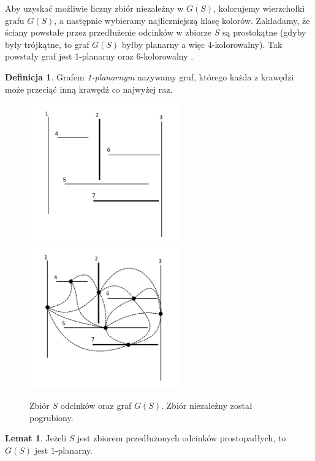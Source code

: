 \documentclass[brudnopis]{xmgr}
\theoremstyle{definition}
\newtheorem{Lemat}{Lemat}
\newtheorem{Definicja}{Definicja}
\begin{document}
\indent Aby uzyskać możliwie liczny zbiór niezależny w $G(S)$, kolorujemy wierzchołki grafu $G(S)$, a następnie wybieramy najliczniejszą klasę kolorów. Zakładamy, że ściany powstałe przez przedłużenie odcinków w zbiorze $S$ są prostokątne (gdyby były trójkątne, to graf $G(S)$ byłby planarny a więc 4-kolorowalny). 
Tak powstały graf jest 1-planarny oraz 6-kolorowalny \cite{borodin}.

\begin{Definicja}
  Grafem \emph{1-planarnym} nazywamy graf, którego każda z krawędzi może przeciąć inną krawędź co najwyżej raz.
\end{Definicja}
\begin{figure}[ht!]
  \centering
  \includegraphics[width=6.5cm]{rysunki/zbior_odcinkow.png}
  \includegraphics[width=6.5cm]{rysunki/graf_zbioru_odcinkow.png}
  \caption{Zbiór $S$ odcinków oraz graf $G(S)$. Zbiór niezależny został pogrubiony.}
  \label{fig:przedluzone odcinki}
\end{figure} 

\begin{Lemat} \cite{knadajniki}
  Jeżeli $S$ jest zbiorem przedłużonych odcinków prostopadłych, to $G(S)$ jest $1$-planarny.
\end{Lemat}
\end{document}
